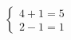 \documentclass[preview]{standalone}
\begin{document}
\begin{align*}
\left\{ \begin{array}{cl} 4 + 1= 5 \\[1pt] 2 - 1 = 1 \end{array} \right.
\end{align*}
\end{document}
